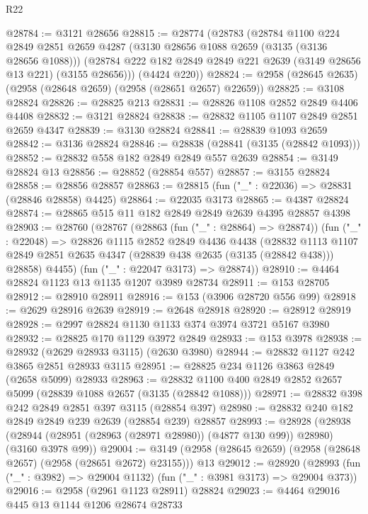 \begin{lexlean}{R22}
\begin{coremodule}
@28784 := @3121 @28656
@28815 := @28774
    (@28783
      (@28784
        @1100
        @224
        @2849
        @2851
        @2659
        @4287
        (@3130 @28656 @1088 @2659 (@3135 (@3136 @28656 @1088)))
        (@28784 @222 @182 @2849 @2849 @221 @2639 (@3149 @28656 @13 @221) (@3155 @28656)))
      (@4424 @220))
@28824 := @2958 (@28645 @2635) (@2958 (@28648 @2659) (@2958 (@28651 @2657) @22659))
@28825 := @3108 @28824
@28826 := @28825 @213
@28831 := @28826 @1108 @2852 @2849 @4406 @4408
@28832 := @3121 @28824
@28838 := @28832 @1105 @1107 @2849 @2851 @2659 @4347
@28839 := @3130 @28824
@28841 := @28839 @1093 @2659
@28842 := @3136 @28824
@28846 := @28838 (@28841 (@3135 (@28842 @1093)))
@28852 := @28832 @558 @182 @2849 @2849 @557 @2639
@28854 := @3149 @28824 @13
@28856 := @28852 (@28854 @557)
@28857 := @3155 @28824
@28858 := @28856 @28857
@28863 := @28815 (fun ("_" : @22036) => @28831 (@28846 @28858) @4425)
@28864 := @22035 @3173
@28865 := @4387 @28824
@28874 := @28865 @515 @11 @182 @2849 @2849 @2639 @4395 @28857 @4398
@28903 := @28760
    (@28767
      (@28863 (fun ("_" : @28864) => @28874))
      (fun ("_" : @22048) =>
      @28826
        @1115
        @2852
        @2849
        @4436
        @4438
        (@28832
          @1113
          @1107
          @2849
          @2851
          @2635
          @4347
          (@28839 @438 @2635 (@3135 (@28842 @438)))
          @28858)
        @4455)
      (fun ("_" : @22047 @3173) => @28874))
@28910 := @4464 @28824 @1123 @13 @1135 @1207 @3989 @28734
@28911 := @153 @28705
@28912 := @28910 @28911
@28916 := @153 (@3906 @28720 @556 @99)
@28918 := @2629 @28916 @2639
@28919 := @2648 @28918
@28920 := @28912 @28919
@28928 := @2997 @28824 @1130 @1133 @374 @3974 @3721 @5167 @3980
@28932 := @28825 @170 @1129 @3972 @2849
@28933 := @153 @3978
@28938 := @28932 (@2629 @28933 @3115) (@2630 @3980)
@28944 := @28832 @1127 @242 @3865 @2851 @28933 @3115
@28951 := @28825 @234 @1126 @3863 @2849 (@2658 @5099) @28933
@28963 := @28832 @1100 @400 @2849 @2852 @2657 @5099 (@28839 @1088 @2657 (@3135 (@28842 @1088)))
@28971 := @28832 @398 @242 @2849 @2851 @397 @3115 (@28854 @397)
@28980 := @28832 @240 @182 @2849 @2849 @239 @2639 (@28854 @239) @28857
@28993 := @28928
    (@28938 (@28944 (@28951 (@28963 (@28971 @28980)) (@4877 @130 @99)) @28980) (@3160 @3978 @99))
@29004 := @3149 (@2958 (@28645 @2659) (@2958 (@28648 @2657) (@2958 (@28651 @2672) @23155))) @13
@29012 := @28920
    (@28993 (fun ("_" : @3982) => @29004 @1132) (fun ("_" : @3981 @3173) => @29004 @373))
@29016 := @2958 (@2961 @1123 @28911) @28824
@29023 := @4464 @29016 @445 @13 @1144 @1206 @28674 @28733

\end{coremodule}
\end{lexlean}
